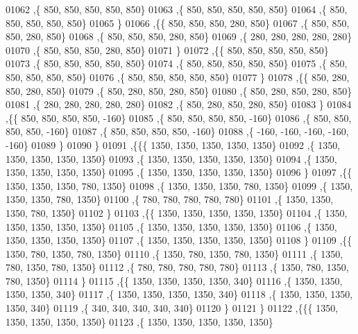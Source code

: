 \begin{DoxyCode}
01062    ,\{   850,   850,   850,   850,   850\}
01063    ,\{   850,   850,   850,   850,   850\}
01064    ,\{   850,   850,   850,   850,   850\}
01065    \}
01066   ,\{\{   850,   850,   850,   280,   850\}
01067    ,\{   850,   850,   850,   280,   850\}
01068    ,\{   850,   850,   850,   280,   850\}
01069    ,\{   280,   280,   280,   280,   280\}
01070    ,\{   850,   850,   850,   280,   850\}
01071    \}
01072   ,\{\{   850,   850,   850,   850,   850\}
01073    ,\{   850,   850,   850,   850,   850\}
01074    ,\{   850,   850,   850,   850,   850\}
01075    ,\{   850,   850,   850,   850,   850\}
01076    ,\{   850,   850,   850,   850,   850\}
01077    \}
01078   ,\{\{   850,   280,   850,   280,   850\}
01079    ,\{   850,   280,   850,   280,   850\}
01080    ,\{   850,   280,   850,   280,   850\}
01081    ,\{   280,   280,   280,   280,   280\}
01082    ,\{   850,   280,   850,   280,   850\}
01083    \}
01084   ,\{\{   850,   850,   850,   850,  -160\}
01085    ,\{   850,   850,   850,   850,  -160\}
01086    ,\{   850,   850,   850,   850,  -160\}
01087    ,\{   850,   850,   850,   850,  -160\}
01088    ,\{  -160,  -160,  -160,  -160,  -160\}
01089    \}
01090   \}
01091  ,\{\{\{  1350,  1350,  1350,  1350,  1350\}
01092    ,\{  1350,  1350,  1350,  1350,  1350\}
01093    ,\{  1350,  1350,  1350,  1350,  1350\}
01094    ,\{  1350,  1350,  1350,  1350,  1350\}
01095    ,\{  1350,  1350,  1350,  1350,  1350\}
01096    \}
01097   ,\{\{  1350,  1350,  1350,   780,  1350\}
01098    ,\{  1350,  1350,  1350,   780,  1350\}
01099    ,\{  1350,  1350,  1350,   780,  1350\}
01100    ,\{   780,   780,   780,   780,   780\}
01101    ,\{  1350,  1350,  1350,   780,  1350\}
01102    \}
01103   ,\{\{  1350,  1350,  1350,  1350,  1350\}
01104    ,\{  1350,  1350,  1350,  1350,  1350\}
01105    ,\{  1350,  1350,  1350,  1350,  1350\}
01106    ,\{  1350,  1350,  1350,  1350,  1350\}
01107    ,\{  1350,  1350,  1350,  1350,  1350\}
01108    \}
01109   ,\{\{  1350,   780,  1350,   780,  1350\}
01110    ,\{  1350,   780,  1350,   780,  1350\}
01111    ,\{  1350,   780,  1350,   780,  1350\}
01112    ,\{   780,   780,   780,   780,   780\}
01113    ,\{  1350,   780,  1350,   780,  1350\}
01114    \}
01115   ,\{\{  1350,  1350,  1350,  1350,   340\}
01116    ,\{  1350,  1350,  1350,  1350,   340\}
01117    ,\{  1350,  1350,  1350,  1350,   340\}
01118    ,\{  1350,  1350,  1350,  1350,   340\}
01119    ,\{   340,   340,   340,   340,   340\}
01120    \}
01121   \}
01122  ,\{\{\{  1350,  1350,  1350,  1350,  1350\}
01123    ,\{  1350,  1350,  1350,  1350,  1350\}

\end{DoxyCode}
